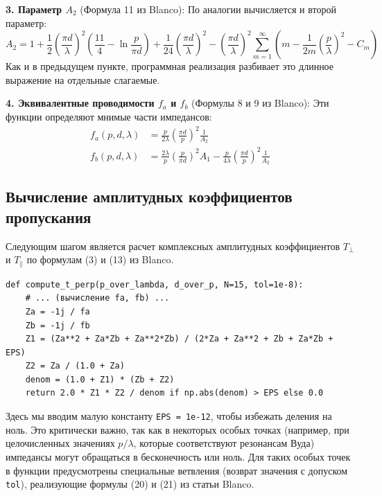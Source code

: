 \textbf{3. Параметр $A_2$} (Формула 11 из Blanco):
По аналогии вычисляется и второй параметр:
\begin{equation*}
A_2 = 1 + \frac{1}{2}\left(\frac{\pi d}{\lambda}\right)^2 \left( \frac{11}{4} - \ln\frac{p}{\pi d} \right) + \frac{1}{24}\left(\frac{\pi d}{\lambda}\right)^2 - \left(\frac{\pi d}{\lambda}\right)^2 \sum_{m=1}^\infty \left( m - \frac{1}{2m}\left(\frac{p}{\lambda}\right)^2 - C_m \right)
\end{equation*}
Как и в предыдущем пункте, программная реализация разбивает это длинное выражение на отдельные слагаемые.

\textbf{4. Эквивалентные проводимости $f_a$ и $f_b$} (Формулы 8 и 9 из Blanco):
Эти функции определяют мнимые части импедансов:
\begin{align*}
f_a(p, d, \lambda) &= \frac{p}{2\lambda}\left(\frac{\pi d}{p}\right)^2 \frac{1}{A_2} \\
f_b(p, d, \lambda) &= \frac{2\lambda}{p}\left(\frac{p}{\pi d}\right)^2 A_1 - \frac{p}{4\lambda}\left(\frac{\pi d}{p}\right)^2 \frac{1}{A_2}
\end{align*}

\subsection{Вычисление амплитудных коэффициентов пропускания}

Следующим шагом является расчет комплексных амплитудных коэффициентов $T_\perp$ и $T_\parallel$ по формулам (3) и (13) из Blanco. 

\begin{verbatim}
def compute_t_perp(p_over_lambda, d_over_p, N=15, tol=1e-8):
    # ... (вычисление fa, fb) ...
    Za = -1j / fa
    Zb = -1j / fb
    Z1 = (Za**2 + Za*Zb + Za**2*Zb) / (2*Za + Za**2 + Zb + Za*Zb + EPS)
    Z2 = Za / (1.0 + Za)
    denom = (1.0 + Z1) * (Zb + Z2)
    return 2.0 * Z1 * Z2 / denom if np.abs(denom) > EPS else 0.0
\end{verbatim}
Здесь мы вводим малую константу \texttt{EPS = 1e-12}, чтобы избежать деления на ноль. Это критически важно, так как в некоторых особых точках (например, при целочисленных значениях $p/\lambda$, которые соответствуют резонансам Вуда) импедансы могут обращаться в бесконечность или ноль. Для таких особых точек в функции предусмотрены специальные ветвления (возврат значения с допуском \texttt{tol}), реализующие формулы (20) и (21) из статьи Blanco.

